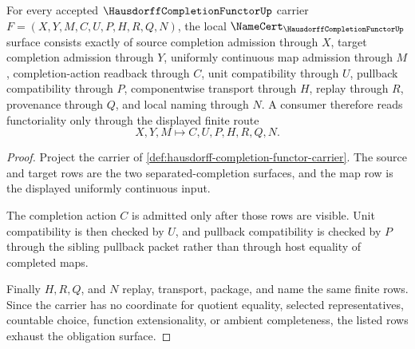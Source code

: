 \begin{theorem}
\label{thm:hausdorff-completion-functor-obligation-surface}
For every accepted $\HausdorffCompletionFunctorUp$ carrier $F=(X,Y,M,C,U,P,H,R,Q,N)$, the local $\NameCert_{\HausdorffCompletionFunctorUp}$ surface consists exactly of source completion admission through $X$, target completion admission through $Y$, uniformly continuous map admission through $M$, completion-action readback through $C$, unit compatibility through $U$, pullback compatibility through $P$, componentwise transport through $H$, replay through $R$, provenance through $Q$, and local naming through $N$. A consumer therefore reads functoriality only through the displayed finite route
$$
X,Y,M \longmapsto C,U,P,H,R,Q,N .
$$
\end{theorem}
\begin{proof}
Project the carrier of \autoref{def:hausdorff-completion-functor-carrier}. The source and target rows are the two separated-completion surfaces, and the map row is the displayed uniformly continuous input.

The completion action $C$ is admitted only after those rows are visible. Unit compatibility is then checked by $U$, and pullback compatibility is checked by $P$ through the sibling pullback packet rather than through host equality of completed maps.

Finally $H,R,Q$, and $N$ replay, transport, package, and name the same finite rows. Since the carrier has no coordinate for quotient equality, selected representatives, countable choice, function extensionality, or ambient completeness, the listed rows exhaust the obligation surface.
\end{proof}

